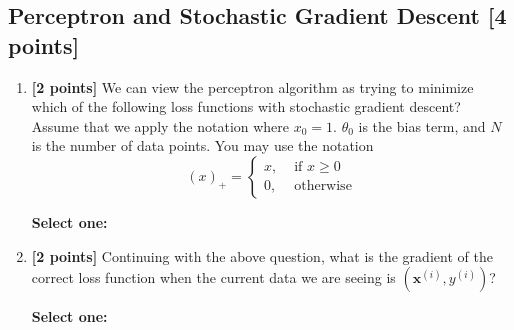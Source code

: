 \documentclass[11pt]{article}
\newcommand{\blackcircle}{\tikz\draw[black,fill=black] (0,0) circle (1ex);}
\renewcommand{\circle}{\tikz\draw[black] (0,0) circle (1ex);}
\numberwithin{equation}{section} %
\numberwithin{figure}{section} %
\numberwithin{table}{section} %
\newcommand{\xv}{\mathbf{x}}
\begin{document}
\subsection{Perceptron and Stochastic Gradient Descent [4 points]}
\begin{enumerate}
    
    \item \textbf{[2 points]} We can view the perceptron algorithm as trying to minimize which of the following loss functions with stochastic gradient descent? Assume that we apply the notation where $x_0 = 1$. $\theta_0$ is the bias term, and $N$ is the number of data points. You may use the notation
    $$
    (x)_+ =
    \begin{cases}
    x, & \textrm{ if } x \geq 0 \\
    0, & \textrm{ otherwise}
    \end{cases}
    $$

    \textbf{Select one:}


    \item \textbf{[2 points]} Continuing with the above question, what is the gradient of the correct loss function when the current data we are seeing is $\left(\xv^{(i)}, y^{(i)}\right)$?

    \textbf{Select one:}

    
\end{enumerate}
\clearpage
\end{document}
